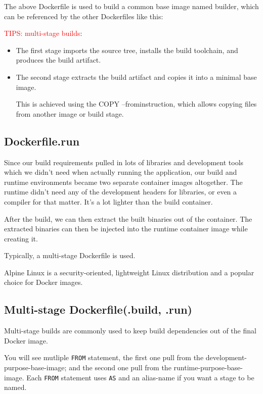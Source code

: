 The above Dockerfile is used to build a common base image named builder, which
can be referenced by the other Dockerfiles like this:

\textcolor{red}{TIPS: multi-stage builds}:

\begin{itemize}
  \item  The first stage imports the source tree, installs the build toolchain, and produces the build artifact.
  
  \item The second stage extracts the build artifact and copies it into a minimal base image.
  
  This is achieved using the COPY --frominstruction, which allows copying files from another image or build stage.
  
  
\end{itemize}


\subsection{Dockerfile.run}


Since our build requirements pulled in lots of libraries and development tools
which we didn’t need when actually running the application, our build and
runtime environments became two separate container images altogether. The
runtime didn’t need any of the development headers for libraries, or even a
compiler for that matter. It’s a lot lighter than the build container.

After the build, we can then extract the built binaries out of the container.
The extracted binaries can then be injected into the runtime container image
while creating it.

Typically, a multi-stage Dockerfile is used. 

Alpine Linux is a security-oriented, lightweight Linux distribution and a
popular choice for Docker images.


\subsection{Multi-stage Dockerfile(.build, .run)}


Multi-stage builds are commonly used to keep build dependencies out of the final Docker image.

You will see mutliple \verb!FROM! statement, the first one pull from the
development-purpose-base-image; and the second one pull from the
runtime-purpose-base-image. Each \verb!FROM! statement uses \verb!AS! and an
alias-name if you want a stage to be named.

